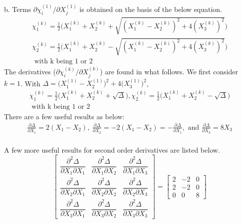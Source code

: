 \documentclass[12pt]{amsart}
\begin{document}
b. Terms $\partial\chi^{(1)}_i/\partial X^{(1)}_j$ is obtained on the basis of the below equation.
\begin{equation}
  \label{eq:princ}
  \begin{split}
    \chi_1^{(k)}=\frac{1}{2}\bigg(X_1^{(k)}+X_2^{(k)}+\sqrt{(X_1^{(k)}-X_2^{(k)})^2+4(X_3^{(k)})^2}\bigg)\\
    \chi_2^{(k)}=\frac{1}{2}\bigg(X_1^{(k)}+X_2^{(k)}-\sqrt{(X_1^{(k)}-X_2^{(k)})^2+4(X_3^{(k)})^2}\bigg)\\
    \text{ with k being 1 or 2}
  \end{split}
\end{equation}
The derivatives ($\partial\chi_i^{(k)}/\partial X_j^{(k)}$) are found in what follows.
We first consider $k=1$.
With $\Delta=\big(X^{(1)}_1-X^{(1)}_2\big)^2 +4\big(X^{(1)}_3\big)^2$,
\begin{equation}
  \label{eq:princ1}
  \begin{split}
    \chi_1^{(k)}=\frac{1}{2}\bigg(X_1^{(k)}+X_2^{(k)}+\sqrt{\Delta}\bigg), \chi_2^{(k)}=\frac{1}{2}\bigg(X_1^{(k)}+X_2^{(k)}-\sqrt{\Delta}\bigg)\\
    \text{ with k being 1 or 2}
  \end{split}
\end{equation}
There are a few useful results as below:
\begin{equation}
  \label{eq:princ2}
  \begin{split}
    \frac{\partial\Delta}{\partial X_1}=2(X_1-X_2),\ \frac{\partial\Delta}{\partial X_2}=-2(X_1-X_2)=-\frac{\partial\Delta}{\partial X_1},\text{ and } \frac{\partial\Delta}{\partial X_3}=8X_3\\
  \end{split}
\end{equation}

A few more useful results for second order derivatives are listed below.
\begin{equation}
  \label{eq:princ3}
  \begin{bmatrix}
    \dfrac{\partial^2\Delta}{\partial X_1 \partial X_1} & \dfrac{\partial^2\Delta}{\partial X_1 \partial X_2} & \dfrac{\partial^2\Delta}{\partial X_1 \partial X_3} \\
    \dfrac{\partial^2\Delta}{\partial X_2 \partial X_1} & \dfrac{\partial^2\Delta}{\partial X_2 \partial X_2} & \dfrac{\partial^2\Delta}{\partial X_2 \partial X_3} \\
    \dfrac{\partial^2\Delta}{\partial X_3 \partial X_1} & \dfrac{\partial^2\Delta}{\partial X_3 \partial X_2} & \dfrac{\partial^2\Delta}{\partial X_3 \partial X_3}
  \end{bmatrix}
  =
  \begin{bmatrix}
    2& -2& 0\\
    2& -2& 0\\
    0&  0& 8
  \end{bmatrix}
\end{equation}
\end{document}
